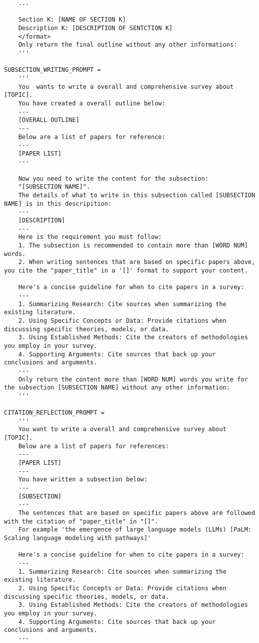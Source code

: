 \begin{lstlisting}
    ...
    
    Section K: [NAME OF SECTION K]
    Description K: [DESCRIPTION OF SENTCTION K]
    </format>
    Only return the final outline without any other informations:
    '''

SUBSECTION_WRITING_PROMPT = 
    '''
    You  wants to write a overall and comprehensive survey about [TOPIC].
    You have created a overall outline below:
    ---
    [OVERALL OUTLINE]
    ---
    Below are a list of papers for reference:
    ---
    [PAPER LIST]
    ---
    
    Now you need to write the content for the subsection:
    "[SUBSECTION NAME]".
    The details of what to write in this subsection called [SUBSECTION NAME] is in this descripition:
    ---
    [DESCRIPTION]
    ---
    Here is the requirement you must follow:
    1. The subsection is recommended to contain more than [WORD NUM] words.
    2. When writing sentences that are based on specific papers above, you cite the "paper_title" in a '[]' format to support your content.    
    
    Here's a concise guideline for when to cite papers in a survey:
    ---
    1. Summarizing Research: Cite sources when summarizing the existing literature.
    2. Using Specific Concepts or Data: Provide citations when discussing specific theories, models, or data.
    3. Using Established Methods: Cite the creators of methodologies you employ in your survey.
    4. Supporting Arguments: Cite sources that back up your conclusions and arguments.
    ---
    Only return the content more than [WORD NUM] words you write for the subsection [SUBSECTION NAME] without any other information:
    '''

CITATION_REFLECTION_PROMPT = 
    '''
    You want to write a overall and comprehensive survey about [TOPIC].
    Below are a list of papers for references:
    ---
    [PAPER LIST]
    ---
    You have written a subsection below:
    ---
    [SUBSECTION]
    ---
    The sentences that are based on specific papers above are followed with the citation of "paper_title" in "[]".
    For example 'the emergence of large language models (LLMs) [PaLM: Scaling language modeling with pathways]'
    
    Here's a concise guideline for when to cite papers in a survey:
    ---
    1. Summarizing Research: Cite sources when summarizing the existing literature.
    2. Using Specific Concepts or Data: Provide citations when discussing specific theories, models, or data.
    3. Using Established Methods: Cite the creators of methodologies you employ in your survey.
    4. Supporting Arguments: Cite sources that back up your conclusions and arguments.
    ---
    

\end{lstlisting}
